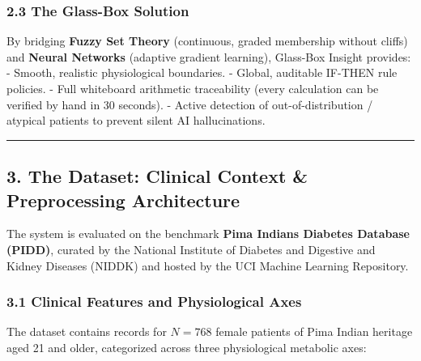 \subsubsection{2.3 The Glass-Box Solution}\label{the-glass-box-solution}

By bridging \textbf{Fuzzy Set Theory} (continuous, graded membership
without cliffs) and \textbf{Neural Networks} (adaptive gradient
learning), Glass-Box Insight provides: - Smooth, realistic physiological
boundaries. - Global, auditable IF-THEN rule policies. - Full whiteboard
arithmetic traceability (every calculation can be verified by hand in 30
seconds). - Active detection of out-of-distribution / atypical patients
to prevent silent AI hallucinations.

\begin{center}\rule{0.5\linewidth}{0.5pt}\end{center}

\subsection{3. The Dataset: Clinical Context \& Preprocessing
Architecture}\label{the-dataset-clinical-context-preprocessing-architecture}

The system is evaluated on the benchmark \textbf{Pima Indians Diabetes
Database (PIDD)}, curated by the National Institute of Diabetes and
Digestive and Kidney Diseases (NIDDK) and hosted by the UCI Machine
Learning Repository.

\subsubsection{3.1 Clinical Features and Physiological
Axes}\label{clinical-features-and-physiological-axes}

The dataset contains records for \(N = 768\) female patients of Pima
Indian heritage aged 21 and older, categorized across three
physiological metabolic axes:

